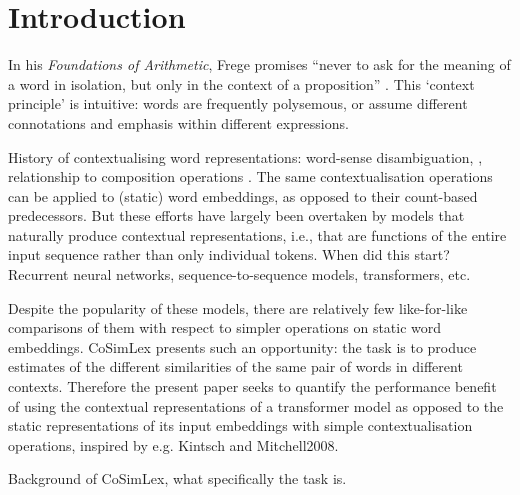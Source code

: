 \section{Introduction}

In his \emph{Foundations of Arithmetic}, Frege promises ``never to ask for the meaning
of a word in isolation, but only in the context of a proposition''
\parencite[xvii]{Frege1980}.
This `context principle' is intuitive: words are frequently polysemous, or assume
different connotations and emphasis within different expressions.

History of contextualising word representations: word-sense disambiguation,
\textcite{Kintsch2001}, relationship to composition operations
\parencite{Mitchell2008}.
The same contextualisation operations can be applied to (static) word embeddings, as
opposed to their count-based predecessors.
But these efforts have largely been overtaken by models that naturally produce
contextual representations, i.e., that are functions of the entire input sequence
rather than only individual tokens.
When did this start?
Recurrent neural networks, sequence-to-sequence models, transformers, etc.

Despite the popularity of these models, there are relatively few
like-for-like comparisons of them with respect to simpler operations on static word
embeddings.
CoSimLex presents such an opportunity: the task is to produce estimates of the
different similarities of the same pair of words in different contexts.
Therefore the present paper seeks to quantify the performance benefit of using the
contextual representations of a transformer model as opposed to the static
representations of its input embeddings with simple contextualisation operations,
inspired by e.g. Kintsch and Mitchell2008.

Background of CoSimLex, what specifically the task is.
